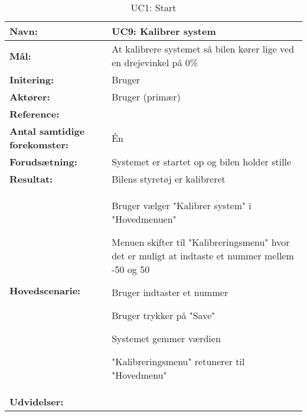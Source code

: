 \begin{table}[h]
\begin{tabularx}{\textwidth}{| >{\raggedright\arraybackslash}p{3.3 cm} | >{\raggedright\arraybackslash}X |} \hline

\textbf{Navn:} 						& UC9: Kalibrer system\\ \hline
\textbf{Mål:}						& At kalibrere systemet så bilen kører lige ved en drejevinkel på 0\% \\ \hline
\textbf{Initering:}					& Bruger \\ \hline
\textbf{Aktører:} 					& Bruger (primær) \\ \hline
\textbf{Reference:} 			    & \\ \hline
\textbf{Antal samtidige forekomster:} & Én \\ \hline
\textbf{Forudsætning:} 				& Systemet er startet op og bilen holder stille\\ \hline
\textbf{Resultat:}					& Bilens styretøj er kalibreret \\ \hline
\textbf{Hovedscenarie:}				& 

\begin{packed_enum}
\item Bruger vælger "Kalibrer system" i "Hovedmenuen" 
\item Menuen skifter til "Kalibreringsmenu" hvor det er muligt at indtaste et nummer mellem -50 og 50 
\item Bruger indtaster et nummer 
\item Bruger trykker på "Save"
\item Systemet gemmer værdien 
\item "Kalibreringsmenu" retunerer til "Hovedmenu"
\end{packed_enum} \\ \hline
\textbf{Udvidelser:}				&  
\textbf{}
\\ \hline
\end{tabularx}
\caption{UC1: Start}
\label{tbl:UC1}
\end{table}